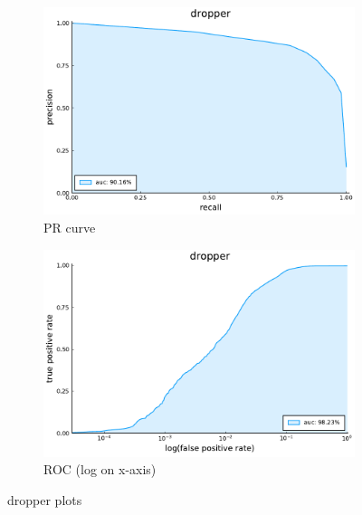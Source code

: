 \begin{figure}
    \centering
    \begin{subfigure}{.49\textwidth}
      \centering
      \includegraphics[width=1\linewidth]{pdfs/modperf/dropper.bson-pr.pdf}
      \caption{PR curve}
    \end{subfigure}
    \begin{subfigure}{.49\textwidth}
        \centering
        \includegraphics[width=1\linewidth]{pdfs/modperf/dropper.bson-roclog.pdf}
        \caption{ROC (log on x-axis)}
    \end{subfigure}
    \caption{dropper plots}
    \label{fig:fig}
\end{figure}

